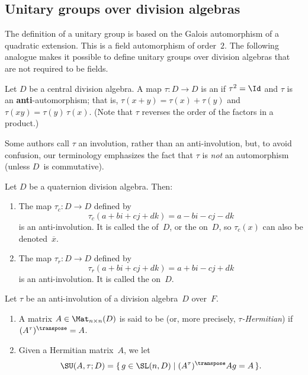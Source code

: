 \subsection{Unitary groups over division algebras}
The definition of a unitary group is based on the Galois automorphism of a quadratic extension. This is a field automorphism of order~$2$. The following analogue makes it possible to define unitary groups over division algebras that are not required to be fields.

\begin{defn}
 Let $D$ be a central division algebra. A map $\tau
\colon D \to D$ is an  if $\tau^2 =
\Id$ and $\tau$ is an \textbf{anti}-automorphism; that is,
$\tau(x+y) = \tau(x) + \tau(y)$ and $\tau(xy) =
\tau(y) \, \tau(x)$. (Note that $\tau$ reverses the order of
the factors in a product.)
 \end{defn}

\begin{terminology}
 Some authors call $\tau$ an involution, rather than an
anti-involution, but, to avoid confusion, our terminology emphasizes
the fact that $\tau$ is \emph{not} an automorphism (unless
$D$~is commutative).
 \end{terminology}

\begin{egs} \label{QuatConjRevDefn}
 Let $D$ be a quaternion division algebra. Then:
 \noprelistbreak
 \begin{enumerate}
 \item The map 
 $\tau_c \colon D \to D$ defined by 
 $$\tau_c(a + bi + cj + dk) = a - bi - cj - dk$$
 is an anti-involution. It is called the  of~$D$, or the  on~$D$, so $\tau_c(x)$ can also be denoted~$\overline{x}$.
 \item The map 
  $\tau_r \colon D \to D$ defined by 
 $$\tau_r(a + bi + cj + dk) = a + bi - cj + dk$$
 is an anti-involution. It is called the
 on~$D$.
 \end{enumerate}
 \end{egs}

\begin{defns} \label{SUDDefn}
Let $\tau$ be an anti-involution of a division
algebra~$D$ over~$F$. 
\noprelistbreak
 \begin{enumerate}
 \item A matrix $A \in \Mat_{n \times n}(D)$ is said to be  (or,
more precisely, \emph{$\tau$-Hermitian}) if $(A^\tau)^\transpose = A$.
\item Given a Hermitian matrix~$A$, we let
	$$ \SU(A,\tau; D) = \{\, g \in \SL(n,D) \mid (A^\tau)^\transpose A g = A \,\} .$$
 \end{enumerate}
 \end{defns}

